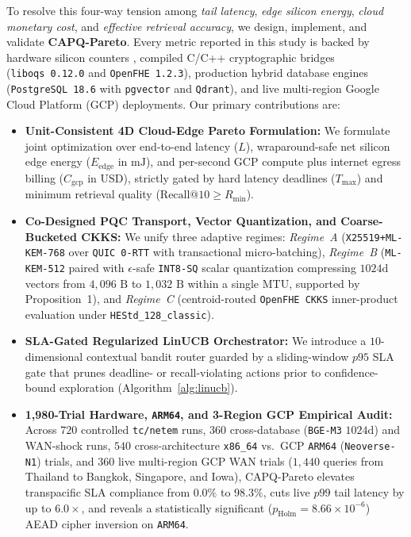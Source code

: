 \documentclass[10pt,journal,compsoc]{IEEEtran}
\begin{document}
To resolve this four-way tension among \emph{tail latency}, \emph{edge silicon energy}, \emph{cloud monetary cost}, and \emph{effective retrieval accuracy}, we design, implement, and validate \textbf{CAPQ-Pareto}. Every metric reported in this study is backed by hardware silicon counters \cite{david2010rapl,khan2018rapl,jay2023power_meters}, compiled C/C++ cryptographic bridges (\texttt{liboqs~0.12.0} and \texttt{OpenFHE~1.2.3}), production hybrid database engines (\texttt{PostgreSQL~18.6} with \texttt{pgvector} and \texttt{Qdrant}), and live multi-region Google Cloud Platform (GCP) deployments. Our primary contributions are:
\begin{itemize}
    \item \textbf{Unit-Consistent 4D Cloud-Edge Pareto Formulation:} We formulate joint optimization over end-to-end latency ($L$), wraparound-safe net silicon edge energy ($E_{\text{edge}}$ in $\text{mJ}$), and per-second GCP compute plus internet egress billing ($C_{\text{gcp}}$ in $\text{USD}$), strictly gated by hard latency deadlines ($T_{\max}$) and minimum retrieval quality ($\text{Recall@10} \ge R_{\min}$).
    \item \textbf{Co-Designed PQC Transport, Vector Quantization, and Coarse-Bucketed CKKS:} We unify three adaptive regimes: \emph{Regime~A} (\texttt{X25519+\allowbreak ML-KEM-768} over \texttt{QUIC 0-RTT} \cite{iyengar2021rfc9000} with transactional micro-batching), \emph{Regime~B} (\texttt{ML-KEM-512} paired with $\epsilon$-safe \texttt{INT8-SQ} scalar quantization compressing $1024\text{d}$ vectors from $4{,}096\text{ B}$ to $1{,}032\text{ B}$ within a single MTU, supported by Proposition~1), and \emph{Regime~C} (centroid-routed \texttt{OpenFHE CKKS} inner-product evaluation under \texttt{HEStd\_128\_classic}).
    \item \textbf{SLA-Gated Regularized LinUCB Orchestrator:} We introduce a $10$-dimensional contextual bandit router \cite{li2010linucb,abbasi2011improved_bandits} guarded by a sliding-window $p95$ SLA gate that prunes deadline- or recall-violating actions prior to confidence-bound exploration (Algorithm~\ref{alg:linucb}).
    \item \textbf{1,980-Trial Hardware, \texttt{ARM64}, and 3-Region GCP Empirical Audit:} Across $720$ controlled \texttt{tc/netem} runs, $360$ cross-database (\texttt{BGE-M3} $1024\text{d}$) and WAN-shock runs, $540$ cross-architecture \texttt{x86\_64} vs.\ GCP \texttt{ARM64} (\texttt{Neoverse-N1}) trials, and $360$ live multi-region GCP WAN trials ($1{,}440$ queries from Thailand to Bangkok, Singapore, and Iowa), CAPQ-Pareto elevates transpacific SLA compliance from $0.0\%$ to $98.3\%$, cuts live $p99$ tail latency by up to $6.0\times$, and reveals a statistically significant ($p_{\text{Holm}} = 8.66 \times 10^{-6}$) AEAD cipher inversion on \texttt{ARM64}.
\end{itemize}
\end{document}

